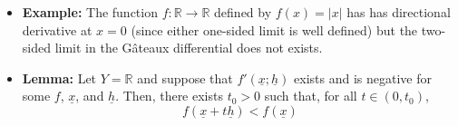 \documentclass[11pt,twoside]{report}
\newcommand{\bbR}{{\mathbb{R}}}
\newcommand{\vecnot}{\underline}
\begin{document}
\begin{itemize}
\begin{itemize}
\item  However, it some cases it might be possible that the directional derivative exists in all direction but is not linear (and hence $f$ is not G\^{a}teaux differentiable). In these cases the G\^{a}teaux differential may fail to exist. %
\end{itemize}

\item \textbf{Example:} The function $f \colon \bbR \to \bbR$ defined by $f(x) = |x|$ has has directional derivative at $x=0$ (since either one-sided limit is well defined) but the  two-sided limit in the G\^{a}teaux differential does not exists. 

\item \textbf{Lemma:} 
Let $Y=\bbR$ and suppose that $ f' (\vecnot{x};\vecnot{h})$ exists and is negative for some $f$, $\vecnot{x}$, and $\vecnot{h}$.  Then, there exists $t_0 > 0$ such that, for all $t\in(0,t_0)$, 
\[ f(\vecnot{x}+t \vecnot{h}) < f (\vecnot{x})
 \]
















\end{itemize}
\end{document}

